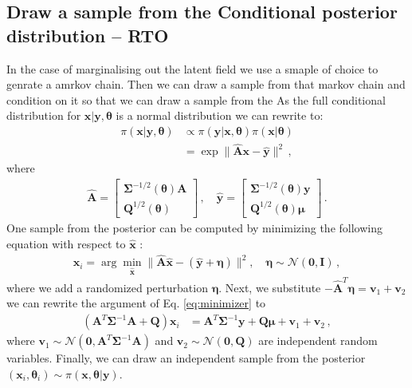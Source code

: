 \subsection{Draw a sample from the Conditional posterior distribution -- RTO}
In the case of marginalising out the latent field we use a smaple of choice to genrate a amrkov chain.
Then we can draw a sample from that markov chain and condition on it so that we can draw a sample from the 
As the full conditional distribution for $\bm{x}| \bm{y} , \bm{\theta} $ is a normal distribution we can rewrite to:
\begin{align}
	\pi(\bm{x}|\bm{y}, \bm{\theta} ) &\propto \pi(\bm{y} | \bm{x} , \bm{\theta} ) \pi(\bm{x}| \bm{\theta}) \\
	&= \exp  \lVert \hat{\bm{A}} \bm{x} - \hat{\bm{y}} \rVert^2 \, ,
\end{align}
where 
\begin{align}
	\label{eq:minimizer}
	\hat{\bm{A}} = 
	\begin{bmatrix}
		\bm{\Sigma}^{-1/2}(\bm{\theta})  \bm{A}\\
		\bm{Q}^{1/2}(\bm{\theta}) 
	\end{bmatrix} \, , \quad \hat{\bm{y}} = 
	\begin{bmatrix}
		\bm{\Sigma}^{-1/2}(\bm{\theta})  \bm{y} \\
		\bm{Q}^{1/2}(\bm{\theta}) \bm{\mu}
	\end{bmatrix} \, .
\end{align}
One sample from the posterior can be computed by minimizing the following equation with respect to $\hat{\bm{x}}$ :
\begin{align}
	\bm{x}_i = \arg \min_{\hat{\bm{x}}} \lVert \hat{\bm{A}} \hat{\bm{x}} - ( \hat{\bm{y}} + \bm{\eta} ) \rVert^2 , \quad \bm{\eta} \sim \mathcal{N}(\bm{0}, \mathbf{I}) \, ,
\end{align}
where we add a randomized perturbation $\bm{\eta}$.
Next, we substitute $ - \hat{\bm{A}}^T  \bm{\eta}  = \bm{v}_1 + \bm{v}_2$ we can rewrite the argument of Eq. \ref{eq:minimizer} to 
\begin{align}
	\label{eq:RTO}
	(\bm{A}^T \bm{\Sigma}^{-1} \bm{A}+
	\bm{Q} ) \bm{x}_i &= \bm{A}^T \bm{\Sigma}^{-1} \bm{y} +  \bm{Q} \bm{\mu} + \bm{v}_1 + \bm{v}_2 \,  ,
\end{align}
where $\bm{v}_1 \sim \mathcal{N}(\bm{0}, \bm{A}^T \bm{\Sigma}^{-1} \bm{A}) $ and $\bm{v}_2 \sim \mathcal{N}(\bm{0}, \bm{Q} )$ are independent random variables.
Finally, we can draw an independent sample from the posterior $(\bm{x}_i, \bm{\theta}_i) \sim \pi(\bm{x}, \bm{\theta} | \bm{y})$.


